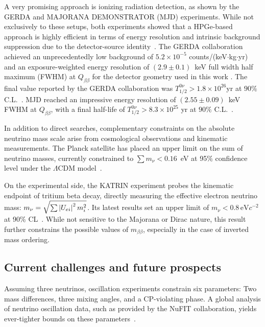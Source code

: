 A very promising approach is ionizing radiation detection, as shown by the GERDA and MAJORANA DEMONSTRATOR (MJD) experiments. While not exclusively to these setups, both experiments showed that a HPGe-based approach is highly efficient in terms of energy resolution and intrinsic background suppression due to the detector-source identity~\cite{dandrea_neutrinoless_2021}. 
The GERDA collaboration achieved an unprecedentedly low background of $5.2 \times 10^{-5}$ counts/(keV$\cdot$kg$\cdot$yr) and an exposure-weighted energy resolution of $(2.9 \pm 0.1)$~keV full width half maximum (FWHM) at $Q_{\beta \beta}$ for the detector geometry used in this work
. The final value reported by the GERDA collaboration was $T^{0 \nu}_{1/2} > 1.8 \times 10^{26}$yr at $90\%$ C.L.~\cite{gerda_collaboration_final_2020}.  
MJD reached an impressive energy resolution of $(2.55 \pm 0.09)$~keV FWHM at $Q_{\beta \beta}$, with a final half-life of $T^{0 \nu}_{1/2} > 8.3 \times 10^{25}$ yr at $90 \%$ C.L.~\cite{majorana_collaboration_final_2023}.

In addition to direct searches, complementary constraints on the absolute neutrino mass scale arise from cosmological observations and kinematic measurements. 
The Planck satellite has placed an upper limit on the sum of neutrino masses, currently constrained to $\sum m_\nu < 0.16$~eV at 95\% confidence level under the $\Lambda \mathrm{CDM}$ model~\cite{ivanov_cosmological_2020}. 

On the experimental side, the KATRIN experiment probes the kinematic endpoint of tritium beta decay, directly measuring the effective electron neutrino mass: $m_\nu = \sqrt{\sum \abs{U_{ei}}^2 \, m_i^2}$. Its latest results set an upper limit of $m_{\nu} < 0.8 \,\mathrm{eV} c^{-2}$ at 90\% CL~\cite{aker_direct_2022}.
While not sensitive to the Majorana or Dirac nature, this result further constrains the possible values of $m_{\beta \beta}$, especially in the case of inverted mass ordering. 



\subsection{Current challenges and future prospects}


Assuming three neutrinos, oscillation experiments constrain six parameters: Two mass differences, three mixing angles, and a CP-violating phase. A global analysis of neutrino oscillation data, such as provided by the NuFIT collaboration, yields ever-tighter bounds on these parameters~\cite{esteban_nufit-60_2024}. 

